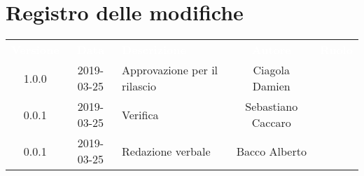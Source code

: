\section*{Registro delle modifiche}
{
	\renewcommand{\arraystretch}{1.5}
	\centering
	\begin{longtable}{ c c  C{4cm}  c  c }
		
		\textcolor{white}{\textbf{Versione}} & \textcolor{white}{\textbf{Data}} & \textcolor{white}{\textbf{Descrizione}} & \textcolor{white}{\textbf{Autore}} & \textcolor{white}{\textbf{Ruolo}}\\
		1.0.0 & 2019-03-25 & Approvazione per il rilascio & Ciagola Damien & \Res{}\\
		0.0.1 & 2019-03-25 & Verifica & Sebastiano Caccaro & \ver{}\\
		0.0.1 & 2019-03-25 & Redazione verbale & Bacco Alberto & \reda{}\\
		
		
	\end{longtable}
	
}
